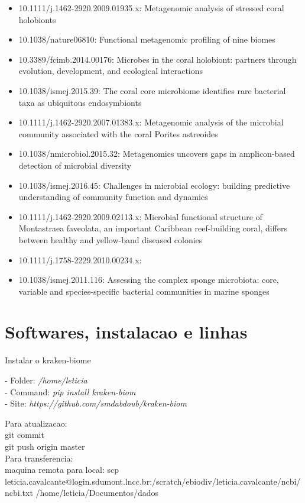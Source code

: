\documentclass[12pt, a4paper]{report}
\begin{document}
\begin{itemize}
\item 10.1111/j.1462-2920.2009.01935.x: Metagenomic analysis of stressed coral holobionts
\item 10.1038/nature06810: Functional metagenomic profiling of nine biomes
\item 10.3389/fcimb.2014.00176: Microbes in the coral holobiont: partners through evolution, development, and ecological interactions
\item 10.1038/ismej.2015.39: The coral core microbiome identifies rare bacterial
taxa as ubiquitous endosymbionts
\item 10.1111/j.1462-2920.2007.01383.x: Metagenomic analysis of the microbial community
associated with the coral Porites astreoides
\item  10.1038/nmicrobiol.2015.32: Metagenomics uncovers gaps in amplicon-based
detection of microbial diversity
\item 10.1038/ismej.2016.45: Challenges in microbial ecology: building predictive
understanding of community function and dynamics
\item 10.1111/j.1462-2920.2009.02113.x: Microbial functional structure of Montastraea faveolata,
an important Caribbean reef-building coral, differs
between healthy and yellow-band diseased colonies
\item 10.1111/j.1758-2229.2010.00234.x: 
\item 10.1038/ismej.2011.116: Assessing the complex sponge microbiota: core, variable and species-specific bacterial communities
in marine sponges
\end{itemize}

\chapter{Softwares, instalacao e linhas}

Instalar o kraken-biome

\begin{tcolorbox}[width=6.0in]
	- Folder: \textit{/home/leticia}\\
	- Command: \textit{pip install kraken-biom}\\
	- Site: \textit{https://github.com/smdabdoub/kraken-biom}
\end{tcolorbox}

Para atualizacao: \\
git commit \\
git push origin master \\

Para transferencia: \\
maquina remota para local:
scp leticia.cavalcante@login.sdumont.lncc.br:/scratch/ebiodiv/leticia.cavalcante/ncbi/ncbi.txt /home/leticia/Documentos/dados
\end{document}
